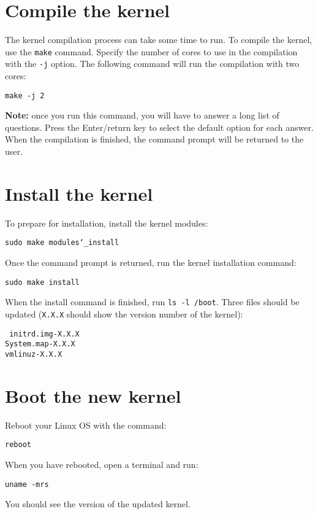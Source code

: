 \documentclass[12pt,a4paper]{report}
\begin{document}
\section{Compile the kernel}
The kernel compilation process can take some time to run. To compile the kernel, use the \texttt{make} command. Specify the number of cores to use in the compilation with the \texttt{-j} option. The following command will run the compilation with two cores:
\newline
\newline
\centerline{\texttt{make -j 2}}
\newline
\newline 
\textbf{Note:} once you run this command, you will have to answer a long list of questions. Press the Enter/return key to select the default option for each answer. When the compilation is finished, the command prompt will be returned to the user.

\section{Install the kernel}
To prepare for installation, install the kernel modules:
\newline
\newline
\centerline{\texttt{sudo make modules\char`_install}}
\newline
\newline 
Once the command prompt is returned, run the kernel installation command:
\newline
\newline
\centerline{\texttt{sudo make install}}
\newline
\newline 
When the install command is finished, run \texttt{ls -l /boot}. Three files should be updated (\texttt{X.X.X} should show the version number of the kernel):
\newline
\newline
\centerline{\texttt{
initrd.img-X.X.X
\\
System.map-X.X.X
\\
vmlinuz-X.X.X
}}
\section{Boot the new kernel}
Reboot your Linux OS with the command:
\newline
\newline
\centerline{\texttt{reboot}}
\newline
\newline 
When you have rebooted, open a terminal and run:
\newline
\newline
\centerline{\texttt{uname -mrs}}
\newline
\newline 
You should see the version of the updated kernel.
\end{document}
